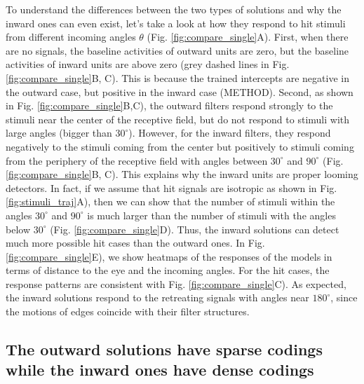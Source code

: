 \documentclass[pdftex,9pt,lineno]{elife}
\begin{document}
To understand the differences between the two types of solutions and why the inward ones can even exist, let's take a look at how they respond to hit stimuli from different incoming angles $\theta$ (Fig. \ref{fig:compare_single}A). First, when there are no signals, the baseline activities of outward units are zero, but the baseline activities of inward units are above zero (grey dashed lines in Fig. \ref{fig:compare_single}B, C). This is because the trained intercepts are negative in the outward case, but positive in the inward case (METHOD). Second, as shown in Fig. \ref{fig:compare_single}B,C), the outward filters respond strongly to the stimuli near the center of the receptive field, but do not respond to stimuli with large angles (bigger than $30^{\circ}$). However, for the inward filters, they respond negatively to the stimuli coming from the center but positively to stimuli coming from the periphery of the receptive field with angles between $30^{\circ}$ and $90^{\circ}$ (Fig. \ref{fig:compare_single}B, C). This explains why the inward units are proper looming detectors. In fact, if we assume that hit signals are isotropic as shown in Fig. \ref{fig:stimuli_traj}A), then we can show that the number of stimuli within the angles $30^{\circ}$ and $90^{\circ}$ is much larger than the number of stimuli with the angles below $30^{\circ}$ (Fig. \ref{fig:compare_single}D). Thus, the inward solutions can detect much more possible hit cases than the outward ones. In Fig. \ref{fig:compare_single}E), we show heatmaps of the responses of the models in terms of distance to the eye and the incoming angles. For the hit cases, the response patterns are consistent with Fig. \ref{fig:compare_single}C). As expected, the inward solutions respond to the retreating signals with angles near $180^{\circ}$, since the motions of edges coincide with their filter structures.

\subsection{The outward solutions have sparse codings while the inward ones have dense codings}



\end{document}
